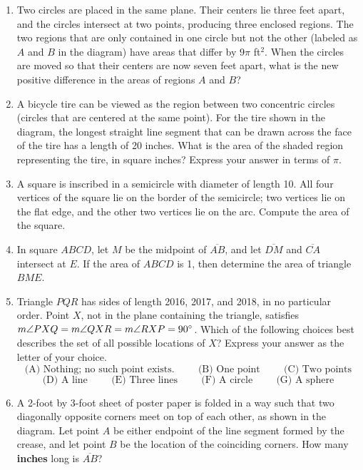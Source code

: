 \documentclass[11pt]{article}
\begin{document}
\begin{enumerate}[1.]
			\item Two circles are placed in the same plane. Their centers lie three feet apart, and the circles intersect at two points, producing three enclosed regions. The two regions that are only contained in one circle but not the other (labeled as $A$ and $B$ in the diagram) have areas that differ by $9\pi$ ft$^2$. When the circles are moved so that their centers are now seven feet apart, what is the new positive difference in the areas of regions $A$ and $B$?
			
			\item A bicycle tire can be viewed as the region between two concentric circles (circles that are centered at the same point). For the tire shown in the diagram, the longest straight line segment that can be drawn across the face of the tire has a length of 20 inches. What is the area of the shaded region representing the tire, in square inches? Express your answer in terms of $\pi$.
			
			\item A square is inscribed in a semicircle with diameter of length 10. All four vertices of the square lie on the border of the semicircle; two vertices lie on the flat edge, and the other two vertices lie on the arc. Compute the area of the square.
			
			\item In square $ABCD$, let $M$ be the midpoint of $\overline{AB}$, and let $\overline{DM}$ and $\overline{CA}$ intersect at $E$. If the area of $ABCD$ is 1, then determine the area of triangle $BME$.
			
			\item Triangle $PQR$ has sides of length 2016, 2017, and 2018, in no particular order. Point $X$, not in the plane containing the triangle, satisfies $m\angle PXQ = m\angle QXR = m\angle RXP = 90\degree$. Which of the following choices best describes the set of all possible locations of $X$? Express your answer as the letter of your choice.
			$$\text{(A) Nothing; no such point exists.}   \hspace{1cm}\text{(B) One point}\hspace{1cm}\text{(C) Two points}$$ 
			$$\text{(D) A line}\hspace{1cm}\text{(E) Three lines}\hspace{1cm}\text{(F) A circle}\hspace{1cm}\text{(G) A sphere}$$
			
			\item A 2-foot by 3-foot sheet of poster paper is folded in a way such that two diagonally opposite corners meet on top of each other, as shown in the diagram. Let point $A$ be either endpoint of the line segment formed by the crease, and let point $B$ be the location of the coinciding corners. How many \textbf{inches} long is $\overline{AB}$?
			

\end{enumerate}
\end{document}
